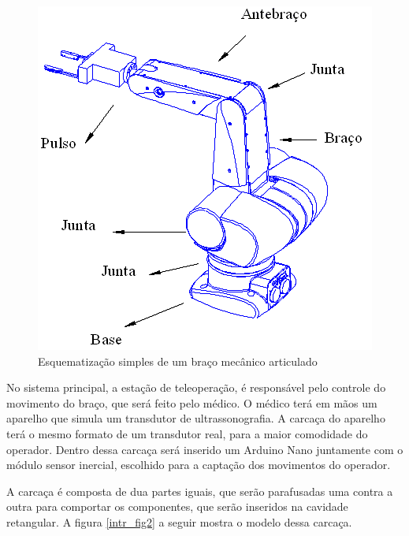 \begin{figure}[H]
	\centering	\includegraphics[keepaspectratio=true,scale=0.5]{figuras/braco_mecanico_1.png}
	\caption{Esquematização simples de um braço mecânico articulado \cite{valdemircarrara2011}}
	\label{intr_fig1}
\end{figure}

No sistema principal, a estação de teleoperação, é responsável pelo controle do movimento do braço, que será feito pelo médico. O médico terá em mãos um aparelho que simula um transdutor de ultrassonografia. A carcaça do aparelho terá o mesmo formato de um transdutor real, para a maior comodidade do operador. Dentro dessa carcaça será inserido um Arduino Nano juntamente com o módulo sensor inercial, escolhido para a captação dos movimentos do operador.

A carcaça é composta de dua partes iguais, que serão parafusadas uma contra a outra para comportar os componentes, que serão inseridos na cavidade retangular. A figura \ref{intr_fig2} a seguir mostra o modelo dessa carcaça.


